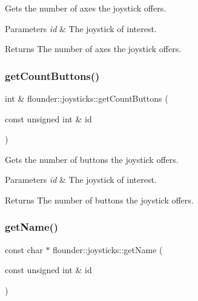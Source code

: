 Gets the number of axes the joystick offers. 


\begin{DoxyParams}{Parameters}
{\em id} & The joystick of interest. \\
\hline
\end{DoxyParams}
\begin{DoxyReturn}{Returns}
The number of axes the joystick offers. 
\end{DoxyReturn}
\mbox{\label{classflounder_1_1joysticks_af66c613d9ffcebd1ab2f799b77fe1fb2}} 
\subsubsection{\texorpdfstring{get\+Count\+Buttons()}{getCountButtons()}}
{\footnotesize\ttfamily int \& flounder\+::joysticks\+::get\+Count\+Buttons (\begin{DoxyParamCaption}\item[{const unsigned int \&}]{id }\end{DoxyParamCaption})}



Gets the number of buttons the joystick offers. 


\begin{DoxyParams}{Parameters}
{\em id} & The joystick of interest. \\
\hline
\end{DoxyParams}
\begin{DoxyReturn}{Returns}
The number of buttons the joystick offers. 
\end{DoxyReturn}
\mbox{\label{classflounder_1_1joysticks_a41c18546c939fc33a563ecc6b920d9dc}} 
\subsubsection{\texorpdfstring{get\+Name()}{getName()}}
{\footnotesize\ttfamily const char $\ast$ flounder\+::joysticks\+::get\+Name (\begin{DoxyParamCaption}\item[{const unsigned int \&}]{id }\end{DoxyParamCaption})}



